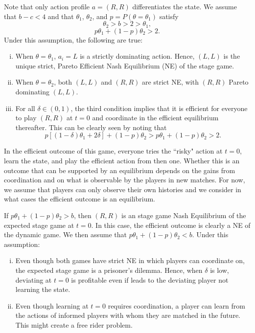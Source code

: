 \documentclass[12pt,letterpaper]{article}
\begin{document}
Note that only action profile $a=(R,R)$ differentiates the state. We assume that $b-c<4$ and that $\theta_1$, $\theta_2$, and $p=P(\theta=\theta_1)$ satisfy $$\theta_2>b>2>\theta_1,$$ $$p\theta_1+(1-p)\theta_2>2.$$ Under this assumption, the following are true:

\begin{enumerate}[i.]
    \item When $\theta=\theta_1$, $a_i=L$ is a strictly dominating action. Hence, $(L,L)$ is the unique strict, Pareto Efficient Nash Equilibrium (NE) of the stage game.

    \item When $\theta=\theta_2$, both $(L,L)$ and $(R,R)$ are strict NE, with $(R,R)$ Pareto dominating $(L,L)$.

    \item For all $\delta\in(0,1)$, the third condition implies that it is efficient for everyone to play $(R,R)$ at $t=0$ and coordinate in the efficient equilibrium thereafter. This can be clearly seen by noting that \begin{equation*}
        p[(1-\delta)\theta_1+2\delta]+(1-p)\theta_2> p\theta_1+(1-p)\theta_2>2.
    \end{equation*}
\end{enumerate}

In the efficient outcome of this game, everyone tries the ``risky" action at $t=0$, learn the state, and play the efficient action from then one. Whether this is an outcome that can be supported by an equilibrium depends on the gains from coordination and on what is observable by the players in new matches. For now, we assume that players can only observe their own histories and we consider in what cases the efficient outcome is an equilibrium. 

If $p\theta_1+(1-p)\theta_2>b$, then $(R,R)$ is an stage game Nash Equilibrium of the expected stage game at $t=0$. In this case, the efficient outcome is clearly a NE of the dynamic game. We then assume that $p\theta_1+(1-p)\theta_2<b$. Under this assumption:

\begin{enumerate}[i.]
    \item Even though both games have strict NE in which players can coordinate on, the expected stage game is a prisoner's dilemma. Hence, when $\delta$ is low, deviating at $t=0$ is profitable even if leads to the deviating player not learning the state.

    \item Even though learning at $t=0$ requires coordination, a player can learn from the actions of informed players with whom they are matched in the future. This might create a free rider problem.
\end{enumerate}
\end{document}
